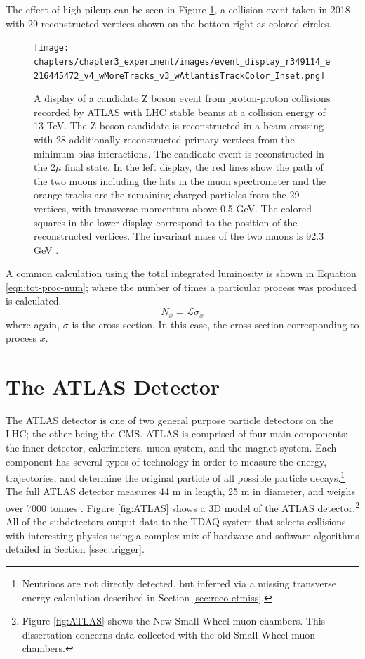 		The effect of high pileup can be seen in Figure \ref{fig:high-pileup-event-display}, a collision event taken in 2018 with 29 reconstructed vertices shown on the bottom right as colored circles.
		\begin{figure}[!ht]
		\centering
		\texttt{[image: chapters/chapter3\_experiment/images/event\_display\_r349114\_e216445472\_v4\_wMoreTracks\_v3\_wAtlantisTrackColor\_Inset.png]}
		\caption{ A display of a candidate Z boson event from proton-proton collisions recorded by \gls{ATLAS} with \gls{LHC} stable beams at a collision energy of 13 TeV. The Z boson candidate is reconstructed in a beam crossing with 28 additionally reconstructed primary vertices from the minimum bias interactions. The candidate event is reconstructed in the 2$\mu$ final state. In the left display, the red lines show the path of the two muons including the hits in the muon spectrometer and the orange tracks are the remaining charged particles from the 29 vertices, with transverse momentum above 0.5 GeV. The colored squares in the lower display correspond to the position of the reconstructed vertices. The invariant mass of the two muons is 92.3 GeV \cite{eventdisplayrun2physics}. }
		\label{fig:high-pileup-event-display}
		\end{figure}


		A common calculation using the total integrated luminosity is shown in Equation \ref{eqn:tot-proc-num}; where the number of times a particular process was produced is calculated.
		\begin{equation}\label{eqn:tot-proc-num}
		N_{x} = \mathcal{L} \sigma_{x}
		\end{equation}
		where again, $\sigma$ is the cross section. In this case, the cross section corresponding to process $x$.


\section{The \gls{ATLAS} Detector}\label{sec:ATLAS}
	The \acrfull{ATLAS} detector is one of two general purpose particle detectors on the \gls{LHC}; the other being the \acrfull{CMS}. \gls{ATLAS} is comprised of four main components: the inner detector, calorimeters, muon system, and the magnet system. Each component has several types of technology in order to measure the energy, trajectories, and determine the original particle of all possible particle decays.\footnote{Neutrinos are not directly detected, but inferred via a missing transverse energy calculation described in Section \ref{sec:reco-etmiss}.} The full \gls{ATLAS} detector measures 44 m in length, 25 m in diameter, and weighs over 7000 tonnes \cite{ATLAS-JINST} . Figure \ref{fig:ATLAS} shows a 3D model of the \gls{ATLAS} detector.\footnote{Figure \ref{fig:ATLAS} shows the New Small Wheel muon-chambers. This dissertation concerns data collected with the old Small Wheel muon-chambers.} All of the subdetectors output data to the \gls{TDAQ} system that selects collisions with interesting physics using a complex mix of hardware and software algorithms detailed in Section \ref{ssec:trigger}. 

